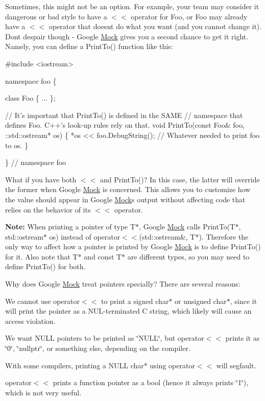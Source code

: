 Sometimes, this might not be an option. For example, your team may consider it dangerous or bad style to have a {\ttfamily $<$$<$} operator for {\ttfamily Foo}, or {\ttfamily Foo} may already have a {\ttfamily $<$$<$} operator that doesn\textquotesingle{}t do what you want (and you cannot change it). Don\textquotesingle{}t despair though -\/ Google \hyperlink{class_mock}{Mock} gives you a second chance to get it right. Namely, you can define a {\ttfamily Print\+To()} function like this\+:


\begin{DoxyCode}
#include <iostream>

namespace foo \{

class Foo \{ ... \};

// It's important that PrintTo() is defined in the SAME
// namespace that defines Foo.  C++'s look-up rules rely on that.
void PrintTo(const Foo& foo, ::std::ostream* os) \{
  *os << foo.DebugString();  // Whatever needed to print foo to os.
\}

\}  // namespace foo
\end{DoxyCode}


What if you have both {\ttfamily $<$$<$} and {\ttfamily Print\+To()}? In this case, the latter will override the former when Google \hyperlink{class_mock}{Mock} is concerned. This allows you to customize how the value should appear in Google \hyperlink{class_mock}{Mock}\textquotesingle{}s output without affecting code that relies on the behavior of its {\ttfamily $<$$<$} operator.

{\bfseries Note\+:} When printing a pointer of type {\ttfamily T$\ast$}, Google \hyperlink{class_mock}{Mock} calls {\ttfamily Print\+To(\+T$\ast$, std\+::ostream$\ast$ os)} instead of {\ttfamily operator$<$$<$(std\+::ostream\&, T$\ast$)}. Therefore the only way to affect how a pointer is printed by Google \hyperlink{class_mock}{Mock} is to define {\ttfamily Print\+To()} for it. Also note that {\ttfamily T$\ast$} and {\ttfamily const T$\ast$} are different types, so you may need to define {\ttfamily Print\+To()} for both.

Why does Google \hyperlink{class_mock}{Mock} treat pointers specially? There are several reasons\+:


\begin{DoxyItemize}
\item We cannot use {\ttfamily operator$<$$<$} to print a {\ttfamily signed char$\ast$} or {\ttfamily unsigned char$\ast$}, since it will print the pointer as a N\+U\+L-\/terminated C string, which likely will cause an access violation.
\item We want {\ttfamily N\+U\+LL} pointers to be printed as {\ttfamily \char`\"{}\+N\+U\+L\+L\char`\"{}}, but {\ttfamily operator$<$$<$} prints it as {\ttfamily \char`\"{}0\char`\"{}}, {\ttfamily \char`\"{}nullptr\char`\"{}}, or something else, depending on the compiler.
\item With some compilers, printing a {\ttfamily N\+U\+LL} {\ttfamily char$\ast$} using {\ttfamily operator$<$$<$} will segfault.
\item {\ttfamily operator$<$$<$} prints a function pointer as a {\ttfamily bool} (hence it always prints {\ttfamily \char`\"{}1\char`\"{}}), which is not very useful. 
\end{DoxyItemize}